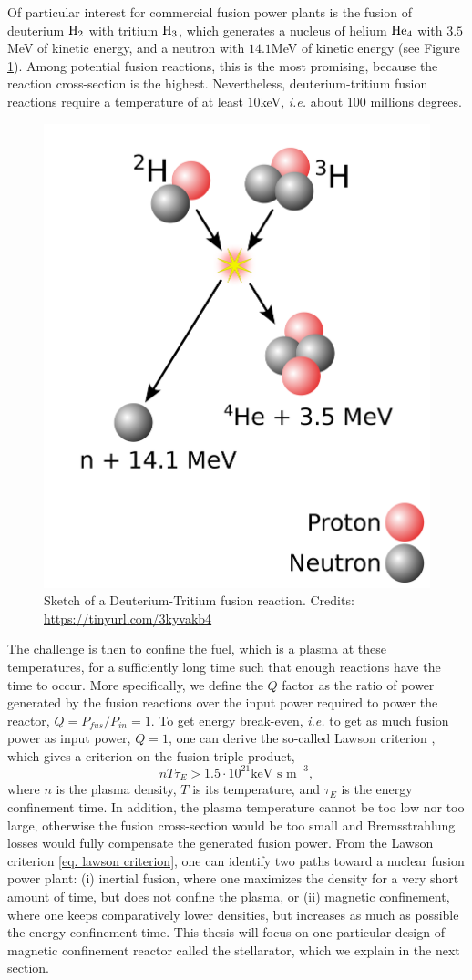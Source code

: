 \documentclass[my_thesis.tex]{subfiles}
\begin{document}
Of particular interest for commercial fusion power plants is the fusion of deuterium $\ce{H2}$ with tritium $\ce{H3}$, which generates a nucleus of helium $\ce{He4}$ with $3.5$MeV of kinetic energy, and a neutron with $14.1$MeV of kinetic energy (see Figure \ref{fig. dt fusion}). Among potential fusion reactions, this is the most promising, because the reaction cross-section is the highest. Nevertheless, deuterium-tritium fusion reactions require a temperature of at least $10$keV, \textit{i.e.} about 100 millions degrees. 
\begin{figure}
    \centering
    \includegraphics[width=.5\linewidth]{images/Introduction/DTFusion.png}
    \caption{Sketch of a Deuterium-Tritium fusion reaction. Credits: \url{https://tinyurl.com/3kyvakb4}}
    \label{fig. dt fusion}
\end{figure}

The challenge is then to confine the fuel, which is a plasma at these temperatures, for a sufficiently long time such that enough reactions have the time to occur. More specifically, we define the $Q$ factor as the ratio of power generated by the fusion reactions over the input power required to power the reactor, $Q=P_{fus}/P_{in}=1$. To get energy break-even, \textit{i.e.} to get as much fusion power as input power, $Q=1$, one can derive the so-called Lawson criterion \citep{lawsonCriteriaPowerProducing1957}, which gives a criterion on the fusion triple product,
\begin{equation}
    nT\tau_E > 1.5\cdot 10^{21}\text{keV s m}^{-3}, \label{eq. lawson criterion}
\end{equation} 
where $n$ is the plasma density, $T$ is its temperature, and $\tau_E$ is the energy confinement time. In addition, the plasma temperature cannot be too low nor too large, otherwise the fusion cross-section would be too small and Bremsstrahlung losses would fully compensate the generated fusion power. From the Lawson criterion \ref{eq. lawson criterion}, one can identify two paths toward a nuclear fusion power plant: (i) inertial fusion, where one maximizes the density for a very short amount of time, but does not confine the plasma, or (ii) magnetic confinement, where one keeps comparatively lower densities, but increases as much as possible the energy confinement time. This thesis will focus on one particular design of magnetic confinement reactor called the stellarator, which we explain in the next section.
\end{document}
